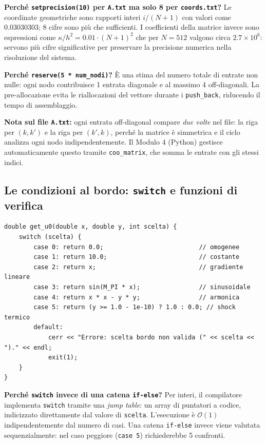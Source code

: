 \documentclass[a4paper,11pt]{article}
\theoremstyle{definition}
\begin{document}
\textbf{Perché \texttt{setprecision(10)} per \texttt{A.txt} ma solo 8 per \texttt{coords.txt}?} Le coordinate geometriche sono rapporti interi $i/(N+1)$ con valori come 0.03030303; 8 cifre sono più che sufficienti. I coefficienti della matrice invece sono espressioni come $\kappa/h^2 = 0.01 \cdot (N+1)^2$ che per $N=512$ valgono circa $2.7 \times 10^6$: servono più cifre significative per preservare la precisione numerica nella risoluzione del sistema.

\textbf{Perché \texttt{reserve(5 * num\_nodi)}?} È una stima del numero totale di entrate non nulle: ogni nodo contribuisce 1 entrata diagonale e al massimo 4 off-diagonali. La pre-allocazione evita le riallocazioni del vettore durante i \texttt{push\_back}, riducendo il tempo di assemblaggio.

\textbf{Nota sul file \texttt{A.txt}:} ogni entrata off-diagonal compare \emph{due volte} nel file: la riga per $(k, k')$ e la riga per $(k', k)$, perché la matrice è simmetrica e il ciclo analizza ogni nodo indipendentemente. Il Modulo 4 (Python) gestisce automaticamente questo tramite \texttt{coo\_matrix}, che somma le entrate con gli stessi indici.

\subsection{Le condizioni al bordo: \texttt{switch} e funzioni di verifica}

\begin{lstlisting}[style=cpp, caption={La funzione get\_u0 parametrizzata con switch}]
double get_u0(double x, double y, int scelta) {
    switch (scelta) {
        case 0: return 0.0;                          // omogenee
        case 1: return 10.0;                         // costante
        case 2: return x;                            // gradiente lineare
        case 3: return sin(M_PI * x);                // sinusoidale
        case 4: return x * x - y * y;                // armonica
        case 5: return (y >= 1.0 - 1e-10) ? 1.0 : 0.0; // shock termico
        default:
            cerr << "Errore: scelta bordo non valida (" << scelta << ")." << endl;
            exit(1);
    }
}
\end{lstlisting}

\textbf{Perché \texttt{switch} invece di una catena \texttt{if-else}?} Per interi, il compilatore implementa \texttt{switch} tramite una \emph{jump table}: un array di puntatori a codice, indicizzato direttamente dal valore di \texttt{scelta}. L'esecuzione è $\mathcal{O}(1)$ indipendentemente dal numero di casi. Una catena \texttt{if-else} invece viene valutata sequenzialmente: nel caso peggiore (\texttt{case 5}) richiederebbe 5 confronti.
\end{document}
